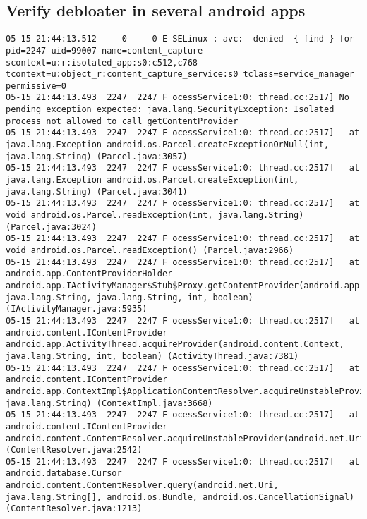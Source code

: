 \label{task:20240515_android}

\subsection{Verify debloater in several android apps}

\begin{lstlisting}
05-15 21:44:13.512     0     0 E SELinux : avc:  denied  { find } for pid=2247 uid=99007 name=content_capture scontext=u:r:isolated_app:s0:c512,c768 tcontext=u:object_r:content_capture_service:s0 tclass=service_manager permissive=0
05-15 21:44:13.493  2247  2247 F ocessService1:0: thread.cc:2517] No pending exception expected: java.lang.SecurityException: Isolated process not allowed to call getContentProvider
05-15 21:44:13.493  2247  2247 F ocessService1:0: thread.cc:2517]   at java.lang.Exception android.os.Parcel.createExceptionOrNull(int, java.lang.String) (Parcel.java:3057)
05-15 21:44:13.493  2247  2247 F ocessService1:0: thread.cc:2517]   at java.lang.Exception android.os.Parcel.createException(int, java.lang.String) (Parcel.java:3041)
05-15 21:44:13.493  2247  2247 F ocessService1:0: thread.cc:2517]   at void android.os.Parcel.readException(int, java.lang.String) (Parcel.java:3024)
05-15 21:44:13.493  2247  2247 F ocessService1:0: thread.cc:2517]   at void android.os.Parcel.readException() (Parcel.java:2966)
05-15 21:44:13.493  2247  2247 F ocessService1:0: thread.cc:2517]   at android.app.ContentProviderHolder android.app.IActivityManager$Stub$Proxy.getContentProvider(android.app.IApplicationThread, java.lang.String, java.lang.String, int, boolean) (IActivityManager.java:5935)
05-15 21:44:13.493  2247  2247 F ocessService1:0: thread.cc:2517]   at android.content.IContentProvider android.app.ActivityThread.acquireProvider(android.content.Context, java.lang.String, int, boolean) (ActivityThread.java:7381)
05-15 21:44:13.493  2247  2247 F ocessService1:0: thread.cc:2517]   at android.content.IContentProvider android.app.ContextImpl$ApplicationContentResolver.acquireUnstableProvider(android.content.Context, java.lang.String) (ContextImpl.java:3668)
05-15 21:44:13.493  2247  2247 F ocessService1:0: thread.cc:2517]   at android.content.IContentProvider android.content.ContentResolver.acquireUnstableProvider(android.net.Uri) (ContentResolver.java:2542)
05-15 21:44:13.493  2247  2247 F ocessService1:0: thread.cc:2517]   at android.database.Cursor android.content.ContentResolver.query(android.net.Uri, java.lang.String[], android.os.Bundle, android.os.CancellationSignal) (ContentResolver.java:1213)

\end{lstlisting}
